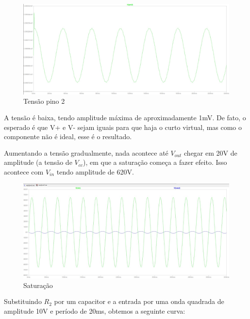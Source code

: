 \documentclass[10pt,twocolumn,letterpaper]{article}
\begin{document}
\begin{figure}[h]
\caption{Tensão pino 2}
\begin{center}
\includegraphics[scale=0.15]{figuras/fig4}
\end{center}
\end{figure}

A tensão é baixa, tendo amplitude máxima de aproximadamente 1mV. De fato, o esperado é que V+ e V- sejam iguais para que haja o curto virtual, mas como o componente não é ideal, esse é o resultado.

Aumentando a tensão gradualmente, nada acontece até $V_{out}$ chegar em 20V de amplitude (a tensão de $V_{cc}$), em que a saturação começa a fazer efeito. Isso acontece com $V_{in}$ tendo amplitude de 620V.
\newpage

\begin{figure}[h]
\caption{Saturação}
\begin{center}
\includegraphics[scale=0.15]{figuras/fig5}
\end{center}
\end{figure}

Substituindo $R_2$ por um capacitor e a entrada por uma onda quadrada de amplitude 10V e período de 20ms, obtemos a seguinte curva: 
\end{document}

